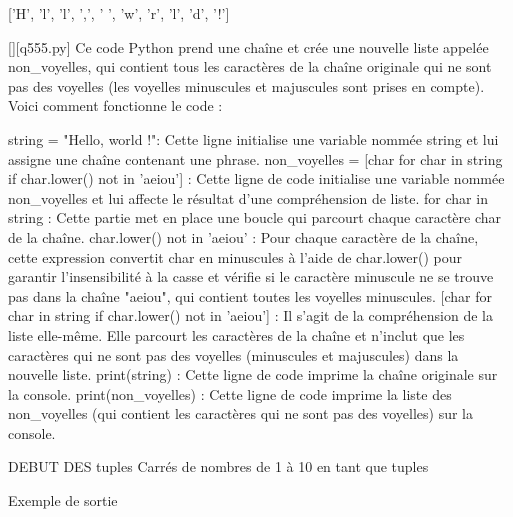 ['H', 'l', 'l', ',', ' ', 'w', 'r', 'l', 'd', '!']
        \par
        \begin{solution}
            \renewcommand{\nomfichier}{q555.py}
            \pythonfile{\chemincode \nomfichier}[][\nomfichier]
            Ce code Python prend une chaîne et crée une nouvelle liste appelée non_voyelles, qui contient tous les caractères de la chaîne originale qui ne sont pas des voyelles (les voyelles minuscules et majuscules sont prises en compte). Voici comment fonctionne le code :

    string = "Hello, world !": Cette ligne initialise une variable nommée string et lui assigne une chaîne contenant une phrase.
    non_voyelles = [char for char in string if char.lower() not in 'aeiou'] : Cette ligne de code initialise une variable nommée non_voyelles et lui affecte le résultat d'une compréhension de liste.
        for char in string : Cette partie met en place une boucle qui parcourt chaque caractère char de la chaîne.
        char.lower() not in 'aeiou' : Pour chaque caractère de la chaîne, cette expression convertit char en minuscules à l'aide de char.lower() pour garantir l'insensibilité à la casse et vérifie si le caractère minuscule ne se trouve pas dans la chaîne "aeiou", qui contient toutes les voyelles minuscules.
        [char for char in string if char.lower() not in 'aeiou'] : Il s'agit de la compréhension de la liste elle-même. Elle parcourt les caractères de la chaîne et n'inclut que les caractères qui ne sont pas des voyelles (minuscules et majuscules) dans la nouvelle liste.
    print(string) : Cette ligne de code imprime la chaîne originale sur la console.
    print(non_voyelles) : Cette ligne de code imprime la liste des non_voyelles (qui contient les caractères qui ne sont pas des voyelles) sur la console.
        \end{solution}
        

        \question
        DEBUT DES tuples
Carrés de nombres de 1 à 10 en tant que tuples

Exemple de sortie

